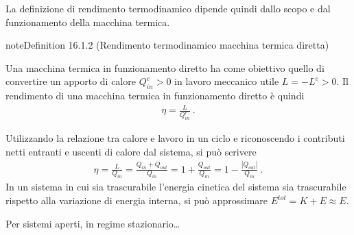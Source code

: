 \documentclass[letterpaper,10pt,italian]{jupyterBook}
\begin{document}
\sphinxAtStartPar
La definizione di rendimento termodinamico dipende quindi dallo scopo e dal funzionamento della macchina termica.
\label{ch/thermodynamics/heat-engine-td-cycles:definition-1}
\begin{sphinxadmonition}{note}{Definition 16.1.2 (Rendimento termodinamico \sphinxhyphen{} macchina termica diretta)}



\sphinxAtStartPar
Una macchina termica in funzionamento diretto ha come obiettivo quello di convertire un apporto di calore \(Q^{e}_{in} > 0\) in lavoro meccanico utile \(L = -L^e > 0\). Il rendimento di una macchina termica in funzionamento diretto è quindi
\begin{equation*}
\begin{split}\eta = \frac{L}{Q^{e}_{in}} \ .\end{split}
\end{equation*}\end{sphinxadmonition}

\sphinxAtStartPar
Utilizzando la relazione tra calore e lavoro in un ciclo  e riconoscendo i contributi netti entranti e uscenti di calore dal sistema, si può scrivere
\begin{equation*}
\begin{split}\eta = \frac{L}{Q_{in}} = \frac{Q_{in} + Q_{out}}{Q_{in}} = 1 + \frac{Q_{out}}{Q_{in}} = 1 - \frac{|Q_{out}|}{Q_{in}} \ .\end{split}
\end{equation*}
\sphinxAtStartPar
{} In un sistema in cui sia trascurabile l’energia cinetica del sistema sia trascurabile rispetto alla variazione di energia interna, si può approssimare \(E^{tot} = K + E \approx E\).

\sphinxAtStartPar
{} Per sistemi aperti, in regime stazionario…

\sphinxstepscope
\end{document}
